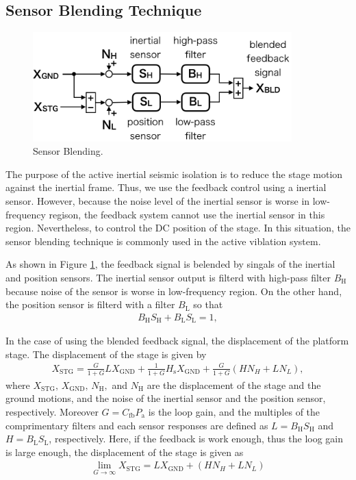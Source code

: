 \subsection{Sensor Blending Technique}
\begin{figure}[h]
  \begin{center}   
    \includegraphics[width=10cm]{./img_chap5/img507.png}
    \caption{Sensor Blending.} \label{img:img507}
  \end{center}
\end{figure}

The purpose of the active inertial seismic isolation is to reduce the stage motion against the inertial frame. Thus, we use the feedback control using a inertial sensor. However, because the noise level of the inertial sensor is worse in low-frequency regison, the feedback system cannot use the inertial sensor in this region. Nevertheless, to control the DC position of the stage. In this situation, the sensor blending technique is commonly used in the active viblation system.

As shown in Figure \ref{img:img507}, the feedback signal is belended by singals of the inertial and position sensors. The inertial sensor output is filterd with high-pass filter $B_{\mathrm{H}}$ because noise of the sensor is worse in low-frequency region. On the other hand, the position sensor is filterd with a filter $B_{\mathrm{L}}$ so that
\begin{eqnarray}
  B_{\mathrm{H}}S_{\mathrm{H}} + B_{\mathrm{L}}S_{\mathrm{L}} = 1,   \label{eq:eq506}
\end{eqnarray}


In the case of using the blended feedback signal, the displacement of the platform stage. The displacement of the stage is given by
\begin{eqnarray}
  X_{\mathrm{STG}} = \frac{G}{1+G}LX_{\mathrm{GND}} + \frac{1}{1+G}H_{\mathrm{s}}X_{\mathrm{GND}} + \frac{G}{1+G}\left(HN_{H}+LN_{L}\right),   \label{eq:eq510}
\end{eqnarray}
where $X_{\mathrm{STG}},\,X_{\mathrm{GND}},\,N_{\mathrm{H}},$ and $N_{\mathrm{H}}$ are the displacement of the stage and the ground motions, and the noise of the inertial sensor and the position sensor, respectively. Moreover $G=C_{\mathrm{fb}}P_{\mathrm{a}}$ is the loop gain, and the multiples of the comprimentary filters and each sensor responses are defined as $L=B_{\mathrm{H}}S_{\mathrm{H}}$ and $H=B_{\mathrm{L}}S_{\mathrm{L}}$, respectively. Here, if the feedback is work enough, thus the loog gain is large enough, the displacement of the stage is given as
\begin{eqnarray}
  \lim_{G\to\infty} X_{\mathrm{STG}} = LX_{\mathrm{GND}} + \left(HN_{H}+LN_{L}\right) \label{eq:eq510_a}
\end{eqnarray}

